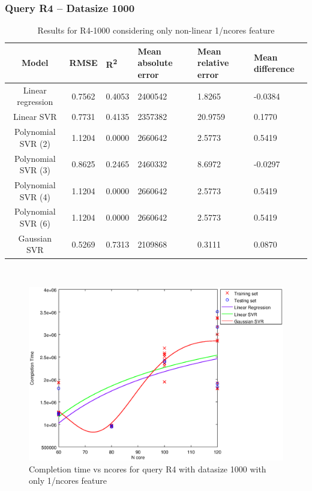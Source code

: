 \documentclass[a4paper,11pt]{article}
\begin{document}
\newpage
\subsubsection{Query R4 -- Datasize 1000}
\begin{table}[H]
	\centering
	\begin{adjustbox}{center}
		\begin{tabular}{c | c M{1.2cm} M{2.5cm} M{2.5cm} M{1.8cm}}
			Model & RMSE & R\textsuperscript{2} & Mean absolute error & Mean relative error & Mean difference \tabularnewline
			\hline
			Linear regression & 0.7562 & 0.4053 & 2400542 & 1.8265 & -0.0384 \\
			Linear SVR & 0.7731 & 0.4135 & 2357382 & 20.9759 & 0.1770 \\
			Polynomial SVR (2) & 1.1204 & 0.0000 & 2660642 & 2.5773 & 0.5419 \\
			Polynomial SVR (3) & 0.8625 & 0.2465 & 2460332 & 8.6972 & -0.0297 \\
			Polynomial SVR (4) & 1.1204 & 0.0000 & 2660642 & 2.5773 & 0.5419 \\
			Polynomial SVR (6) & 1.1204 & 0.0000 & 2660642 & 2.5773 & 0.5419 \\
			Gaussian SVR & 0.5269 & 0.7313 & 2109868 & 0.3111 & 0.0870 \\
		\end{tabular}
	\end{adjustbox}
	\\
	\caption{Results for R4-1000 considering only non-linear 1/ncores feature}
	\label{table_R4_prediction_all}
\end{table}

\begin {figure}[hbtp]
\centering
\includegraphics[width=\textwidth]{output/R4_1000_ONLY_1_OVER_NCORES/plot_R4_1000_bestmodels.eps}
\caption {Completion time vs ncores for query R4 with datasize 1000 with only 1/ncores feature}
\end {figure}
\end{document}
